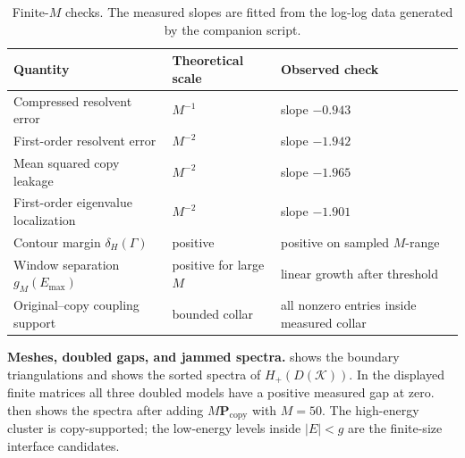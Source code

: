 \documentclass[11pt]{article}
\numberwithin{equation}{section}
\theoremstyle{definition}
\theoremstyle{remark}
\newcommand{\K}{\mathcal{K}}
\newcommand{\Proj}{\mathbf{P}}
\begin{document}
\begin{table}[H]
\centering
\small
\caption{Mesh sizes for the three boundary triangulations \(\K\) and their doubles \(D(\K)\).
The counts agree with the identities in Theorem~\ref{M-thm:counts}.}
\label{tab:meshstats}
\end{table}

\begin{table}[H]
\centering
\small
\caption{Selected numerical outputs: the measured doubled bulk half-gap \(g\) for
\(H_+(D(\K))\), the number of jammed eigenvalues selected by \(|E|<g\) at \(M=50\), and fitted
drift slopes when reported.}
\label{tab:numsummary}
\end{table}

\begin{table}[H]
\centering
\small
\caption{Finite-\(M\) checks. The measured slopes are fitted from the log-log data generated by
the companion script.}
\label{tab:conditionchecks}
\begin{tabular}{@{}lll@{}}
\toprule
Quantity & Theoretical scale & Observed check \\
\midrule
Compressed resolvent error & \(M^{-1}\) & slope \(-0.943\) \\
First-order resolvent error & \(M^{-2}\) & slope \(-1.942\) \\
Mean squared copy leakage & \(M^{-2}\) & slope \(-1.965\) \\
First-order eigenvalue localization & \(M^{-2}\) & slope \(-1.901\) \\
Contour margin \(\delta_H(\Gamma)\) & positive & positive on sampled \(M\)-range \\
Window separation \(g_M(E_{\max})\) & positive for large \(M\) & linear growth after threshold \\
Original--copy coupling support & bounded collar & all nonzero entries inside measured collar \\
\bottomrule
\end{tabular}
\end{table}

\medskip\noindent\textbf{Meshes, doubled gaps, and jammed spectra.}
 shows the boundary triangulations and  shows the sorted spectra of
\(H_+(D(\K))\). In the displayed finite matrices all three doubled models have a positive measured
gap at zero.  then shows the spectra after adding \(M\Proj_{\mathrm{copy}}\) with
\(M=50\). The high-energy cluster is copy-supported; the low-energy levels inside \(|E|<g\) are the
finite-size interface candidates.
\end{document}

